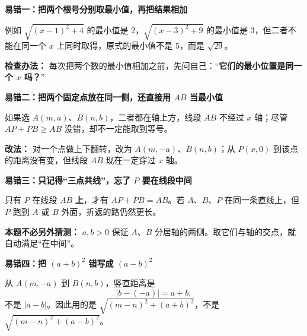 \clearpage
\begin{trapbox}
\textbf{\textcolor{CTrap}{易错一：把两个根号分别取最小值，再把结果相加}}

例如 $\sqrt{(x-1)^2+4}$ 的最小值是 $2$，$\sqrt{(x-3)^2+9}$ 的最小值是 $3$，但二者不能在同一个 $x$ 上同时取得，原式的最小值不是 $5$，而是 $\sqrt{29}$。

\textbf{检查办法：} 每次把两个数的最小值相加之前，先问自己：“\textbf{它们的最小位置是同一个 $x$ 吗？}”

\medskip
\textbf{\textcolor{CTrap}{易错二：把两个固定点放在同一侧，还直接用 $AB$ 当最小值}}

如果选 $A(m,a)$、$B(n,b)$，二者都在轴上方，线段 $AB$ 不经过 $x$ 轴；尽管 $AP+PB\geq AB$ 没错，却不一定能取到等号。

\textbf{改法：} 对一个点做上下翻转，改为 $A(m,-a)$、$B(n,b)$；从 $P(x,0)$ 到该点的距离没有变，但线段 $AB$ 现在一定穿过 $x$ 轴。

\medskip
\textbf{\textcolor{CTrap}{易错三：只记得“三点共线”，忘了 $P$ 要在线段中间}}

只有 $P$ 在线段 $AB$ \textbf{上}，才有 $AP+PB=AB$。若 $A$、$B$、$P$ 在同一条直线上，但 $P$ 跑到 $A$ 或 $B$ 外面，折返的路仍然更长。

\textbf{本题不必另外猜测：} $a,b>0$ 保证 $A$、$B$ 分居轴的两侧。取它们与轴的交点，就自动满足“在中间”。

\medskip
\textbf{\textcolor{CTrap}{易错四：把 $(a+b)^2$ 错写成 $(a-b)^2$}}

从 $A(m,-a)$ 到 $B(n,b)$，竖直距离是
\[
 |b-(-a)|=a+b,
\]
不是 $|a-b|$。因此用的是 $\sqrt{(m-n)^2+(a+b)^2}$，不是 $\sqrt{(m-n)^2+(a-b)^2}$。

\medskip
\end{trapbox}
\clearpage
